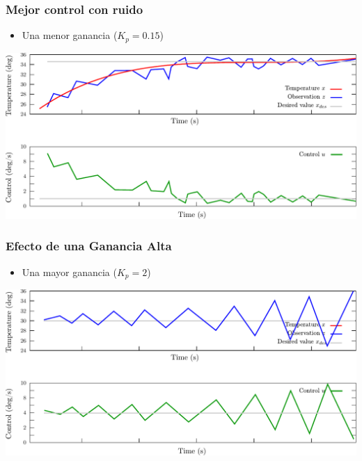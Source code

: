 \begin{frame}
    \frametitle{Mejor control con ruido}
    
    \begin{itemize}
        \item Una menor ganancia ($K_{p} = 0.15$)
    \end{itemize}
    
    \begin{center}
        \includegraphics[width=0.8\columnwidth]{images/pid_control_proportional_lower_gain.pdf}
    \end{center}
    
\end{frame}

\begin{frame}
    \frametitle{Efecto de una Ganancia Alta}
    
    \begin{itemize}
        \item Una mayor ganancia ($K_{p} = 2$)
    \end{itemize}
    
    \begin{center}
        \includegraphics[width=0.8\columnwidth]{images/pid_control_proportional_higher_gain.pdf}
    \end{center}
    
\end{frame}

